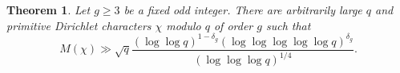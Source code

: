 \documentclass[10pt]{amsart}
\newtheorem{thm}{Theorem}[section]
\theoremstyle{definition}
\newtheorem{rem}{Remark}
\begin{document}
\begin{thm}\label{thm:sharp}
Let $g \geq 3$ be a fixed odd integer. There are arbitrarily large $q$ and primitive Dirichlet characters $\chi$ modulo $q$ of order $g$ such that
$$
M(\chi) \gg \sqrt{q}\frac{(\log\log q)^{1-\delta_g} (\log\log\log\log\log q)^{\delta_g}}{(\log\log\log q)^{1/4}}.
$$
\end{thm}
\end{document}
